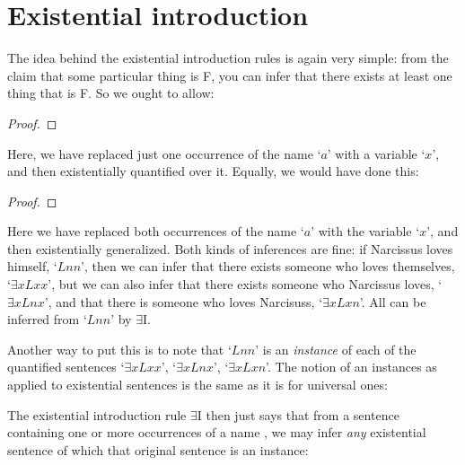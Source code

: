 \section{Existential introduction}
The idea behind the existential introduction rules is again very simple: from the claim that some particular thing is F, you can infer that there exists at least one thing that is F. So we ought to allow:
\begin{proof}
	 
\end{proof}
Here, we have replaced just one occurrence of the name `$a$' with a variable `$x$', and then existentially quantified over it. Equally, we would have done this:
\begin{proof}
	 
\end{proof}
Here we have replaced both occurrences of the name `$a$' with the variable `$x$', and then existentially generalized. Both kinds of inferences are fine: if Narcissus loves himself, `$Lnn$', then we can infer that there exists someone who loves themselves, `$\exists xLxx$', but we can also infer that there exists someone who Narcissus loves, `$\exists xLnx$', and that there is someone who loves Narcisuss, `$\exists xLxn$'.  All can be inferred from `$Lnn$' by $\exists$I.

Another way to put this is to note that `$Lnn$' is an \emph{instance} of each of the quantified sentences `$\exists xLxx$',  `$\exists xLnx$', `$\exists xLxn$'.  The notion of an instances as applied to existential sentences is the same as it is for universal ones:


The existential introduction rule $\exists$I then just says that from a sentence  containing one or more occurrences of a name , we may infer \emph{any} existential sentence of which that original sentence is an instance:



